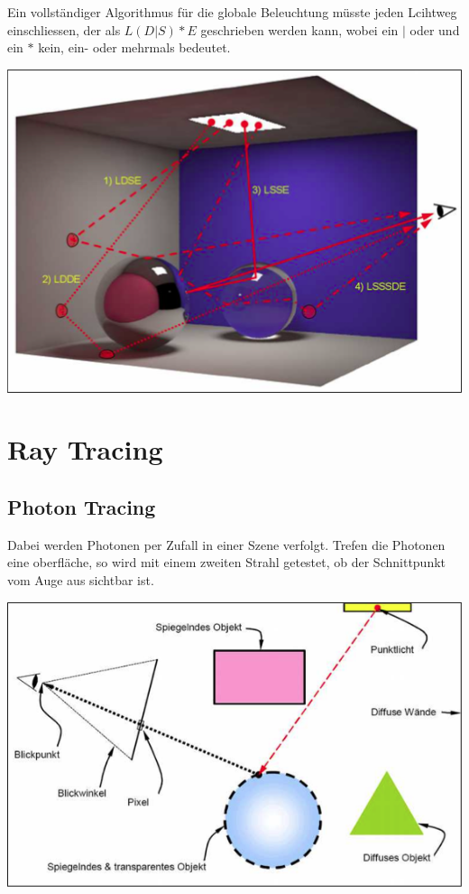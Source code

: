 \documentclass[10pt]{article}
\begin{document}
Ein vollständiger Algorithmus für die globale Beleuchtung müsste jeden Lcihtweg einschliessen, der als $L(D|S)*E$ geschrieben werden kann, wobei ein $|$ oder und ein $*$ kein, ein- oder mehrmals bedeutet.
\begin{center}
	\includegraphics[scale=0.5]{lichtweg-notation.png}
\end{center}

\newpage
\section{Ray Tracing}
\subsection{Photon Tracing}
Dabei werden Photonen per Zufall in einer Szene verfolgt. Trefen die Photonen eine oberfläche, so wird mit einem zweiten Strahl getestet, ob der Schnittpunkt vom Auge aus sichtbar ist.
\begin{center}
	\includegraphics[scale=0.4]{photon-tracing.png}
\end{center}
\end{document}
